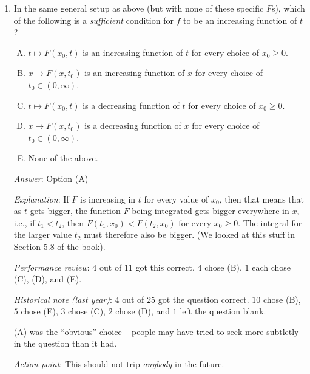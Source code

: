 \documentclass[10pt]{amsart}
\begin{document}
\begin{enumerate}
  {\em Historical note (last year)}: $12$ out of $25$ people got the question
  correct. $6$ chose (E), $3$ chose (C), $2$ each chose (A) and (B).

\item In the same general setup as above (but with none of these
  specific $F$s), which of the following is a {\em sufficient}
  condition for $f$ to be an increasing function of $t$?

  \begin{enumerate}[(A)]
  \item $t \mapsto F(x_0,t)$ is an increasing function of $t$ for
    every choice of $x_0 \ge 0$.
  \item $x \mapsto F(x,t_0)$ is an increasing function of $x$ for
    every choice of $t_0 \in (0,\infty)$.
  \item $t \mapsto F(x_0,t)$ is a decreasing function of $t$ for
    every choice of $x_0 \ge 0$.
  \item $x \mapsto F(x,t_0)$ is a decreasing function of $x$ for
  every choice of $t_0 \in (0,\infty)$.
  \item None of the above.
  \end{enumerate}

  {\em Answer}: Option (A)

  {\em Explanation}: If $F$ is increasing in $t$ for every value of
  $x_0$, then that means that as $t$ gets bigger, the function $F$
  being integrated gets bigger everywhere in $x$, i.e., if $t_1 <
  t_2$, then $F(t_1,x_0) < F(t_2,x_0)$ for every $x_0 \ge 0$. The
  integral for the larger value $t_2$ must therefore also be
  bigger. (We looked at this stuff in Section 5.8 of the book).

  {\em Performance review}: $4$ out of $11$ got this correct. $4$
  chose (B), $1$ each chose (C), (D), and (E).

  {\em Historical note (last year)}: $4$ out of $25$ got the question
  correct. $10$ chose (B), $5$ chose (E), $3$ chose (C), $2$ chose
  (D), and $1$ left the question blank.

  (A) was the ``obvious'' choice -- people may have tried to seek more
  subtletly in the question than it had.

  {\em Action point}: This should not trip {\em anybody} in the future.

\end{enumerate}
\end{document}
